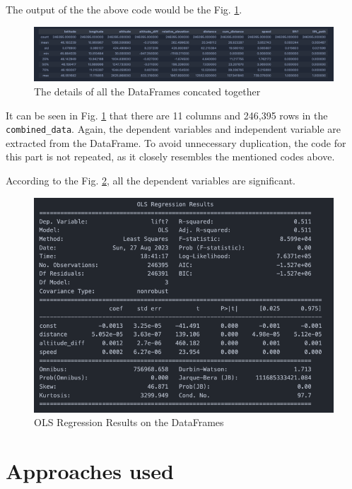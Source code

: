 The output of the the above code would be the Fig. \ref{fig:df_describe}.

\begin{figure}[htb]
	\includegraphics[width=\textwidth]{resources/df_describe.png}
	\caption{The details of all the DataFrames concated together}
	\label{fig:df_describe}
\end{figure}

It can be seen in Fig. \ref{fig:df_describe} that there are 11 columns 
and 246,395 rows in the \texttt{combined\_data}.
Again, the dependent variables and independent variable are extracted from the DataFrame.
To avoid unnecessary duplication, the code for this part is not repeated, as it closely resembles the mentioned codes above.

According to the Fig. \ref{fig:ols}, all the dependent variables are significant.

\begin{figure}[htb]
	\includegraphics[width=\textwidth]{resources/ols.png}
	\caption{OLS Regression Results on the DataFrames}
	\label{fig:ols}
\end{figure}

\section{Approaches used}

